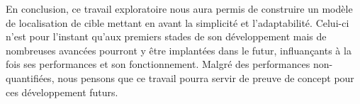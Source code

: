 En conclusion, ce travail exploratoire nous aura permis de construire un modèle de localisation de cible mettant en avant la simplicité et l'adaptabilité.
Celui-ci n'est pour l'instant qu'aux premiers stades de son développement mais de nombreuses avancées pourront y être implantées dans le futur, influançants à la fois ses performances et son fonctionnement.
Malgré des performances non-quantifiées, nous pensons que ce travail pourra servir de preuve de concept pour ces développement futurs.